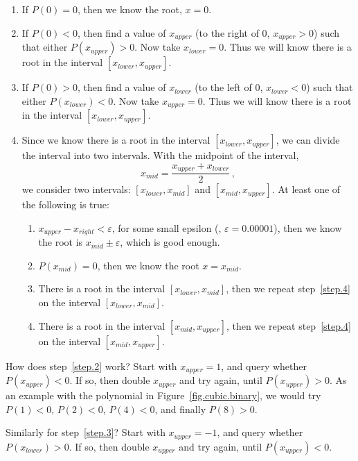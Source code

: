 \begin{enumerate}
\item If $P(0)=0$, then we know the root, $x=0$.
\item \label{step.2} If $P(0)< 0$, then find a value of $x_{upper}$ (to the right of 0, $x_{upper}>0$) such that either $P(x_{upper})>0$.
  Now take $x_{lower}=0$.
  Thus we
  will know there is a root in the interval $[x_{lower}, x_{upper}]$.
\item \label{step.3} If $P(0)> 0$, then find a value of $x_{lower}$ (to the left of 0, $x_{lower}<0$) such that either $P(x_{lower})<0$. 
  Now take $x_{upper}=0$.
 Thus we
  will know there is a root in the interval $[x_{lower}, x_{upper}]$.
\item \label{step.4} Since we know there is a root in the interval
  $[x_{lower}, x_{upper}]$, we can divide the interval into two
  intervals.  With the midpoint of the interval, \[x_{mid} =
  \frac{x_{upper} + x_{lower}}{2}\,,\] we consider two intervals:
  $[x_{lower}, x_{mid}]$ and $[x_{mid}, x_{upper}]$.  At least one of
  the following is true:
  \begin{enumerate}
  \item $x_{upper} - x_{right} < \varepsilon$, for some small epsilon (\eg, $\varepsilon = 0.00001$),
    then we know the root is $x_{mid} \pm \varepsilon$, which is good enough.
  \item $P(x_{mid}) = 0$, then we know the root $x= x_{mid}$.
  \item There is a root in the interval $[x_{lower}, x_{mid}]$, then
    we repeat step~\ref{step.4} on the interval $[x_{lower},
      x_{mid}]$.
  \item There is a root in the interval $[x_{mid}, x_{upper}]$, then
    we repeat step~\ref{step.4} on the interval $[x_{mid},
      x_{upper}]$.
  \end{enumerate}
\end{enumerate}


How does step~\ref{step.2} work?  Start with  $x_{upper}=1$, and query whether ${P(x_{upper}) < 0}$.
If so, then double $x_{upper}$ and try again, until ${P(x_{upper}) > 0}$.  As an example with the polynomial in Figure~\ref{fig.cubic.binary}, we would try ${P(1)< 0}$, ${P(2) < 0}$, ${P(4)<0}$, and finally ${P(8) > 0}$.

Similarly for step~\ref{step.3}?  Start with  $x_{upper}=-1$, and query whether ${P(x_{lower}) > 0}$.
If so, then double $x_{upper}$ and try again, until ${P(x_{upper}) < 0}$.


